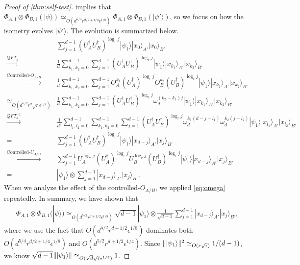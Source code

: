 \documentclass[11pt,letterpaper]{article}
\newcommand{\ket}[1]{|#1\rangle}
\newcommand{\x}{\otimes}
\newcommand{\ct}{^{\dagger}}
\DeclarePairedDelimiter{\norm}{\lVert}{\rVert}
\newcommand{\1}{\mathbb{1}}
\newcommand{\ep}{\epsilon}
\newcommand{\se}{\sqrt{\epsilon}}
\newcommand{\qe}{\epsilon^{1/4}}
\newcommand{\sd}{\sqrt{d}}
\newcommand{\sr}{\sqrt{r}}
\newcommand{\appd}[1]{\simeq_{#1}}
\theoremstyle{definition}
\begin{document}
\begin{proof}[Proof of \cref{thm:self-test}]
 implies that $ \Phi_{A,1} \x \Phi_{B,1} (\ket{\psi}) \appd{O(d^{5/4} r^{d/2 +1/4} \ep^{1/8})}  \Phi_{A,1} \x \Phi_{B,1} (\ket{\psi'})$,  
so we focus on how the isometry evolves $\ket{\psi'}$.
The evolution is summarized below.
	\begin{align*}
		& \sum_{j=1}^{d-1} (U_A\ct U_B\ct)^{\log_r j} \ket{\psi_1} \ket{x_0}_{A'}\ket{x_0}_{B'}\\
		\xrightarrow[]{QFT_d}& \frac{1}{d}\sum_{k_1,k_2 = 0}^{d-1} \sum_{j=1}^{d-1} (U_A\ct U_B\ct)^{\log_r j}  \ket{\psi_1}\ket{x_{k_1}}_{A'}\ket{x_{k_2}}_{B'}\\
		\xrightarrow[]{\text{Controlled-}O_{A/B}}& \frac{1}{d}\sum_{k_1,k_2 = 0}^{d-1} \sum_{j=1}^{d-1} O_A^{k_1}(U_A\ct)^{\log_r j} O_B^{k_2}(U_B\ct)^{\log_r j}
		\ket{\psi_1} \ket{x_{k_1}}_{A'}\ket{x_{k_2}}_{B'}\\
		\appd{O(d^{5/2} r^{d} \sr \qe)}&\frac{1}{d} \sum_{k_1,k_2 = 0}^{d-1} \sum_{j=1}^{d-1} (U_A\ct U_B\ct)^{\log_r j}\omega_d^{(k_2-k_1)j}\ket{\psi_1} \ket{x_{k_1}}_{A'}\ket{x_{k_2}}_{B'}\\
		\xrightarrow[]{QFT_d^{-1}} &\frac{1}{d^2}\sum_{l_1,l_2 = 0}^{d-1}\sum_{k_1,k_2 = 0}^{d-1}\sum_{j=1}^{d-1} (U_A\ct U_B\ct)^{\log_r j} 
		\omega_d^{k_1(d-j-l_1)}\omega_d^{k_2(j-l_2)}\ket{\psi_1} \ket{x_{l_1}}_{A'}\ket{x_{l_2}}_{B'}\\
		= &\sum_{j=1}^{d-1}(U_A\ct U_B\ct)^{\log_r j} \ket{\psi_1} \ket{x_{d-j}}_{A'}\ket{x_j}_{B'} \\
		\xrightarrow[]{\text{Controlled-}U_{A/B}}& \sum_{j=1}^{d-1} U_A^{\log_r j} (U_A\ct)^{\log_r j} U_B^{\log_r j} (U_B\ct)^{\log_r j} \ket{\psi_1} \ket{x_{d-j}}_{A'}\ket{x_j}_{B'}\\
		=&\ket{\psi_1} \x \sum_{j=1}^{d-1} \ket{x_{d-j}}_{A'}\ket{x_j}_{B'}.
	\end{align*}
When we analyze the effect of the controlled-$O_{A/B}$, we applied \cref{eq:omega} repeatedly.
In summary, we have shown that
\begin{align}
	\Phi_{A,1}\x\Phi_{B,1}(\ket{\psi}) \appd{O(d^{5/2} r^{d+1/2} \ep^{1/8})} \sqrt{d-1} \ket{\psi_1} \x \frac{1}{\sqrt{d-1}}\sum_{j=1}^{d-1} \ket{x_{d-j}}_{A'}\ket{x_j}_{B'},
\end{align}
where we use the fact that $O(d^{5/2} r^{d+1/2} \ep^{1/8})$ dominates both $O(d^{5/4} r^{d/2+1/4} \ep^{1/8})$ and 
$O(d^{5/2} r^{d+1/2} \qe)$.
Since $\norm{\ket{\psi_1}}^2 \appd{O(r \se)} 1/(d-1)$, we know $ \sqrt{d-1} \norm{\ket{\psi_1}} \appd{O(\sd \sr\qe)} 1$.


\end{proof}
\end{document}
